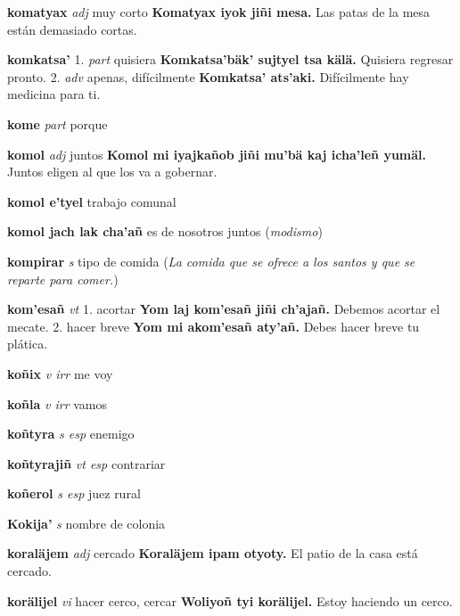 \documentclass[10pt]{scrbook}
\newcommand{\entry}[1]{\textbf{#1}}
\newcommand{\onedefinition}[1]{#1.}
\newcommand{\partofspeech}[1]{\textit{#1}}
\newcommand{\spanishtranslation}[1]{#1}
\newcommand{\clarification}[1]{(\textit{#1})}
\newcommand{\cholexample}[1]{\textbf{#1}}
\newcommand{\exampletranslation}[1]{#1}
\begin{document}
\begin{multicols}{2}
\entry{komatyax}
\partofspeech{adj}
\spanishtranslation{muy corto}
\cholexample{Komatyax iyok jiñi mesa.}
\exampletranslation{Las patas de la mesa están demasiado cortas.}

\entry{komkatsa'}
\onedefinition{1}
\partofspeech{part}
\spanishtranslation{quisiera}
\cholexample{Komkatsa'bäk' sujtyel tsa kälä.}
\exampletranslation{Quisiera regresar pronto.}
\onedefinition{2}
\partofspeech{adv}
\spanishtranslation{apenas, difícilmente}
\cholexample{Komkatsa' ats'aki.}
\exampletranslation{Difícilmente hay medicina para ti.}

\entry{kome}
\partofspeech{part}
\spanishtranslation{porque}

\entry{komol}
\partofspeech{adj}
\spanishtranslation{juntos}
\cholexample{Komol mi iyajkañob jiñi mu'bä kaj icha'leñ yumäl.}
\exampletranslation{Juntos eligen al que los va a gobernar.}

\entry{komol e'tyel}
\spanishtranslation{trabajo comunal}

\entry{komol jach lak cha'añ}
\spanishtranslation{es de nosotros juntos}
\clarification{modismo}

\entry{kompirar}
\partofspeech{s}
\spanishtranslation{tipo de comida}
\clarification{La comida que se ofrece a los santos y que se reparte para comer.}

\entry{kom'esañ}
\partofspeech{vt}
\onedefinition{1}
\spanishtranslation{acortar}
\cholexample{Yom laj kom'esañ jiñi ch'ajañ.}
\exampletranslation{Debemos acortar el mecate.}
\onedefinition{2}
\spanishtranslation{hacer breve}
\cholexample{Yom mi akom'esañ aty'añ.}
\exampletranslation{Debes hacer breve tu plática.}

\entry{koñix}
\partofspeech{v irr}
\spanishtranslation{me voy}

\entry{koñla}
\partofspeech{v irr}
\spanishtranslation{vamos}

\entry{koñtyra}
\partofspeech{s esp}
\spanishtranslation{enemigo}

\entry{koñtyrajiñ}
\partofspeech{vt esp}
\spanishtranslation{contrariar}

\entry{koñerol}
\partofspeech{s esp}
\spanishtranslation{juez rural}

\entry{Kokija'}
\partofspeech{s}
\spanishtranslation{nombre de colonia}

\entry{koraläjem}
\partofspeech{adj}
\spanishtranslation{cercado}
\cholexample{Koraläjem ipam otyoty.}
\exampletranslation{El patio de la casa está cercado.}

\entry{korälijel}
\partofspeech{vi}
\spanishtranslation{hacer cerco, cercar}
\cholexample{Woliyoñ tyi korälijel.}
\exampletranslation{Estoy haciendo un cerco.}


\end{multicols}
\end{document}

